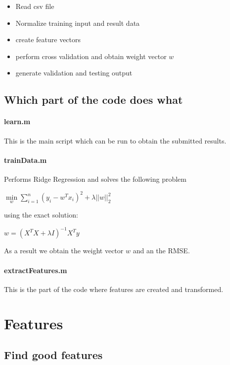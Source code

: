 \documentclass[a4paper, 11pt]{article}
\begin{document}
\begin{itemize}
\item Read csv file
\item Normalize training input and result data
\item create feature vectors
\item perform cross validation and obtain weight vector $w$
\item generate validation and testing output
\end{itemize}

\subsection{Which part of the code does what}

\paragraph{learn.m}
This is the main script which can be run to obtain the submitted results.
\paragraph{trainData.m}
Performs Ridge Regression and solves the following problem

$ \min \limits_w \sum \limits_{i=1}^n \left(y_i - w^Tx_i\right)^2 + \lambda ||w||_2^2$

using the exact solution:


$ w = \left(X^T X + \lambda I   \right)^{-1} X^T y$

As a result we obtain the weight vector $w$ and an the RMSE.

\paragraph{extractFeatures.m}

This is the part of the code where features are created and transformed.


\section{Features}

\subsection{Find good features}
\label{subsec:findgoodfeatures}
\end{document}
